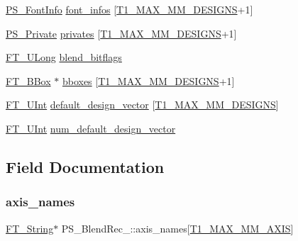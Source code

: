 \begin{DoxyCompactItemize}
\item 
\hyperlink{t1tables_8h_a413d5f096543f289c85f416f688ffc06}{P\+S\+\_\+\+Font\+Info} \hyperlink{struct_p_s___blend_rec___ac5478cafc838257e693a9604edf1f5e9}{font\+\_\+infos} \mbox{[}\hyperlink{t1tables_8h_a933ca229674aa312fd5546fadc95e08f}{T1\+\_\+\+M\+A\+X\+\_\+\+M\+M\+\_\+\+D\+E\+S\+I\+G\+NS}+1\mbox{]}
\item 
\hyperlink{t1tables_8h_af13eae0f58324d685b24cd4079c01c7e}{P\+S\+\_\+\+Private} \hyperlink{struct_p_s___blend_rec___a2b6e0c48d7a9c350b09f2943c1779ea4}{privates} \mbox{[}\hyperlink{t1tables_8h_a933ca229674aa312fd5546fadc95e08f}{T1\+\_\+\+M\+A\+X\+\_\+\+M\+M\+\_\+\+D\+E\+S\+I\+G\+NS}+1\mbox{]}
\item 
\hyperlink{fttypes_8h_a4fac88bdba78eb76b505efa6e4fbf3f5}{F\+T\+\_\+\+U\+Long} \hyperlink{struct_p_s___blend_rec___a86caa5319e208b4a2057db656bad9221}{blend\+\_\+bitflags}
\item 
\hyperlink{ftimage_8h_ae341c4eb5a7199947a13b2a1dcaf7af7}{F\+T\+\_\+\+B\+Box} $\ast$ \hyperlink{struct_p_s___blend_rec___a30845d3cbd2e95a5f9cc867c7226af5e}{bboxes} \mbox{[}\hyperlink{t1tables_8h_a933ca229674aa312fd5546fadc95e08f}{T1\+\_\+\+M\+A\+X\+\_\+\+M\+M\+\_\+\+D\+E\+S\+I\+G\+NS}+1\mbox{]}
\item 
\hyperlink{fttypes_8h_abcb8db4dbf35d2b55a9e8c7b0926dc52}{F\+T\+\_\+\+U\+Int} \hyperlink{struct_p_s___blend_rec___a3ddacbda91fe0f9ef934a9e0afa6286f}{default\+\_\+design\+\_\+vector} \mbox{[}\hyperlink{t1tables_8h_a933ca229674aa312fd5546fadc95e08f}{T1\+\_\+\+M\+A\+X\+\_\+\+M\+M\+\_\+\+D\+E\+S\+I\+G\+NS}\mbox{]}
\item 
\hyperlink{fttypes_8h_abcb8db4dbf35d2b55a9e8c7b0926dc52}{F\+T\+\_\+\+U\+Int} \hyperlink{struct_p_s___blend_rec___afa5c7dd4206eb8a1d9ef4894abfc9555}{num\+\_\+default\+\_\+design\+\_\+vector}
\end{DoxyCompactItemize}


\subsection{Field Documentation}
\mbox{\label{struct_p_s___blend_rec___afc0e4018ff3439f306d61e3c219b91f9}} 
\subsubsection{\texorpdfstring{axis\+\_\+names}{axis\_names}}
{\footnotesize\ttfamily \hyperlink{fttypes_8h_a9846214585359eb2ba6bbb0e6de30639}{F\+T\+\_\+\+String}$\ast$ P\+S\+\_\+\+Blend\+Rec\+\_\+\+::axis\+\_\+names\mbox{[}\hyperlink{t1tables_8h_a471108ae668a65363dd36bb17e1ecbbe}{T1\+\_\+\+M\+A\+X\+\_\+\+M\+M\+\_\+\+A\+X\+IS}\mbox{]}}

